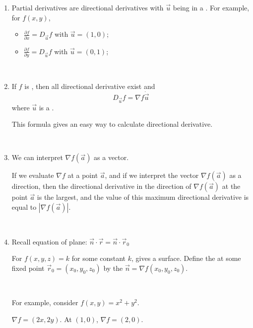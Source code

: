 \documentclass[11pt,fleqn]{book} %
\begin{document}
\begin{enumerate}
    \item Partial derivatives are directional derivatives with $\vec{u}$ being in a . For example, for $f(x,y)$, 

    \begin{itemize}
        \item $\frac{\partial f}{\partial x} = D_{\vec{u}} f$ with $\vec{u} = (1, 0)$;
        \item $\frac{\partial f}{\partial y} = D_{\vec{u}} f$ with $\vec{u} = (0, 1)$;
    \end{itemize}

    {~~~}

    \item If $f$ is , then all directional derivative exist and $$D_{\vec{u}} f = \nabla f \dot \vec{u}$$ where $\vec{u}$ is a . 
    
    This formula gives an easy way to calculate directional derivative.

    {~~~}

    \item We can interpret $\nabla f(\vec{a})$ as a vector. 
    
    If we evaluate $\nabla f$ at a point $\vec{a}$, and if we interpret the vector $\nabla f(\vec{a})$ as a direction, then the directional derivative in the direction of $\nabla f(\vec{a})$ at the point $\vec{a}$ is the largest, and the value of this maximum directional derivative is equal to $| \nabla f(\vec{a}) |$. 

    {~~~}

    \item Recall equation of plane: $\vec{n} \cdot \vec{r} = \vec{n} \cdot \vec{r}_0$
    
    For $f(x, y, z) = k$ for some constant $k$, gives a  surface. Define the  at some fixed point $\vec{r}_0 = (x_0, y_0, z_0)$ by the  $\vec{n} = \nabla f(x_0, y_0, z_0)$.

    {~~~}

    For example, consider $f(x,y) = x^2 + y^2$. 

    $\nabla f = (2x, 2y)$. At $(1,0)$, $\nabla f = (2,0)$. 

    \begin{center}
\end{center}
\end{enumerate}
\end{document}
